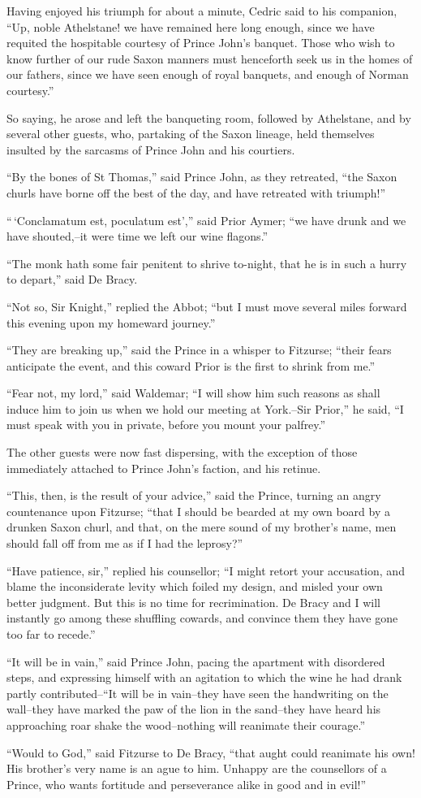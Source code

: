 Having enjoyed his triumph for about a minute, Cedric said to his
companion, ``Up, noble Athelstane! we have remained here long enough,
since we have requited the hospitable courtesy of Prince John's banquet.
Those who wish to know further of our rude Saxon manners must henceforth
seek us in the homes of our fathers, since we have seen enough of royal
banquets, and enough of Norman courtesy.''

So saying, he arose and left the banqueting room, followed by
Athelstane, and by several other guests, who, partaking of the Saxon
lineage, held themselves insulted by the sarcasms of Prince John and his
courtiers.

``By the bones of St Thomas,'' said Prince John, as they retreated,
``the Saxon churls have borne off the best of the day, and have
retreated with triumph!''

``\,`Conclamatum est, poculatum est','' said Prior Aymer; ``we have
drunk and we have shouted,--it were time we left our wine flagons.''

``The monk hath some fair penitent to shrive to-night, that he is in
such a hurry to depart,'' said De Bracy.

``Not so, Sir Knight,'' replied the Abbot; ``but I must move several
miles forward this evening upon my homeward journey.''

``They are breaking up,'' said the Prince in a whisper to Fitzurse;
``their fears anticipate the event, and this coward Prior is the first
to shrink from me.''

``Fear not, my lord,'' said Waldemar; ``I will show him such reasons as
shall induce him to join us when we hold our meeting at York.--Sir
Prior,'' he said, ``I must speak with you in private, before you mount
your palfrey.''

The other guests were now fast dispersing, with the exception of those
immediately attached to Prince John's faction, and his retinue.

``This, then, is the result of your advice,'' said the Prince, turning
an angry countenance upon Fitzurse; ``that I should be bearded at my own
board by a drunken Saxon churl, and that, on the mere sound of my
brother's name, men should fall off from me as if I had the leprosy?''

``Have patience, sir,'' replied his counsellor; ``I might retort your
accusation, and blame the inconsiderate levity which foiled my design,
and misled your own better judgment. But this is no time for
recrimination. De Bracy and I will instantly go among these shuffling
cowards, and convince them they have gone too far to recede.''

``It will be in vain,'' said Prince John, pacing the apartment with
disordered steps, and expressing himself with an agitation to which the
wine he had drank partly contributed--``It will be in vain--they have
seen the handwriting on the wall--they have marked the paw of the lion
in the sand--they have heard his approaching roar shake the
wood--nothing will reanimate their courage.''

``Would to God,'' said Fitzurse to De Bracy, ``that aught could
reanimate his own! His brother's very name is an ague to him. Unhappy
are the counsellors of a Prince, who wants fortitude and perseverance
alike in good and in evil!''
